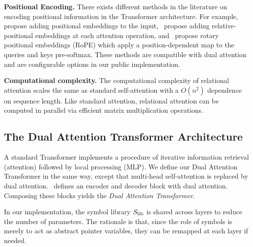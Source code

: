 \textbf{Positional Encoding.} There exists different methods in the literature on encoding positional information in the Transformer architecture. For example,~\citet{vaswani2017attention} propose adding positional embeddings to the input,~\citet{shawSelfAttentionRelativePosition2018b} propose adding relative-positional embeddings at each attention operation, and~\citet{suRoFormerEnhancedTransformer2023} propose rotary positional embeddings (RoPE) which apply a position-dependent map to the queries and keys pre-softmax. These methods are compatible with dual attention and are configurable options in our public implementation.

\textbf{Computational complexity.} The computational complexity of relational attention scales the same as standard self-attention with a $O(n^2)$ dependence on sequence length. Like standard attention, relational attention can be computed in parallel via efficient matrix multiplication operations.

\subsection{The Dual Attention Transformer Architecture}

A standard Transformer implements a procedure of iterative information retrieval (attention) followed by local processing (MLP). We define our Dual Attention Transformer in the same way, except that multi-head self-attention is replaced by dual attention.~ defines an encoder and decoder block with dual attention. Composing these blocks yields the \textit{Dual Attention Transformer}.

\begin{remark}
    In our implementation, the symbol library $S_\mathrm{lib}$ is shared across layers to reduce the number of parameters. 
    The rationale is that, since the role of symbols is merely to act as abstract pointer variables, they can be remapped at each layer if needed.%
\end{remark}


